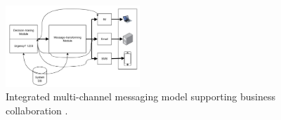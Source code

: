 \documentclass[conference]{IEEEtran}
\begin{document}
\begin{figure}[htbp]
  \centering
  \includegraphics[width=0.45\textwidth]{liu2011-model.jpg}
  \caption{Integrated multi-channel messaging model supporting business collaboration \cite{liu2011}.}
  \label{fig:liu2011}
\end{figure}



\end{document}
